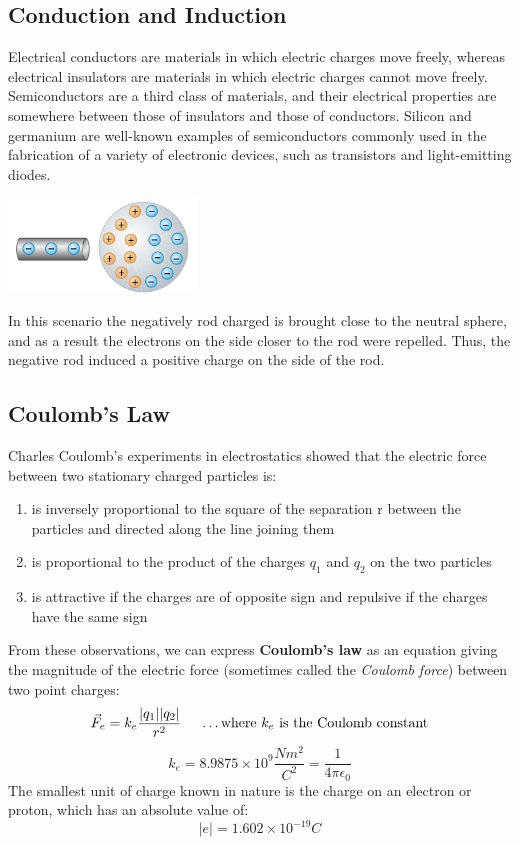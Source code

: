 \documentclass{article}
\begin{document}
\subsection{Conduction and Induction}
Electrical conductors are materials in which electric charges move freely, whereas electrical insulators are materials in which electric charges cannot move freely. Semiconductors are a third class of materials, and their electrical properties are somewhere between those of insulators and those of conductors. Silicon and germanium are well-known examples of semiconductors commonly used in the fabrication of a variety of electronic devices, such as transistors and light-emitting diodes.
\begin{multicols}{2}
  \centerline{\includegraphics[width=5cm]{charges.png}}
  \columnbreak
  In this scenario the negatively rod charged is brought close to the neutral sphere, and as a result the electrons on the side closer to the rod were repelled. Thus, the negative rod induced a positive charge on the side of the rod.
\end{multicols}

\subsection{Coulomb's Law}
Charles Coulomb’s experiments in electrostatics showed that the electric force between two stationary charged particles is:\\
\begin{enumerate}
\item is inversely proportional to the square of the separation r between the particles and directed along the line joining them
\item is proportional to the product of the charges $q_1$ and $q_2$ on the two particles
\item is attractive if the charges are of opposite sign and repulsive if the charges have the same sign\\
\end{enumerate}
From these observations, we can express \textbf{Coulomb’s law} as an equation giving the magnitude of the electric force (sometimes called the \textit{Coulomb force}) between two point charges:
\[
\vec{F}_e=k_e\frac{\lvert q_1\rvert\lvert q_2\rvert}{r^2} \indent
\text{\ldots where $k_e$ is the Coulomb constant}
\]
\[
k_e=8.9875\times 10^9 \frac{Nm^2}{C^2}=\frac{1}{4\pi\epsilon_0}
\]
The smallest unit of charge known in nature is the charge on an electron or proton, which has an absolute value of:
\[
\lvert e \rvert = 1.602\times 10^{-19} C
\]
\end{document}
